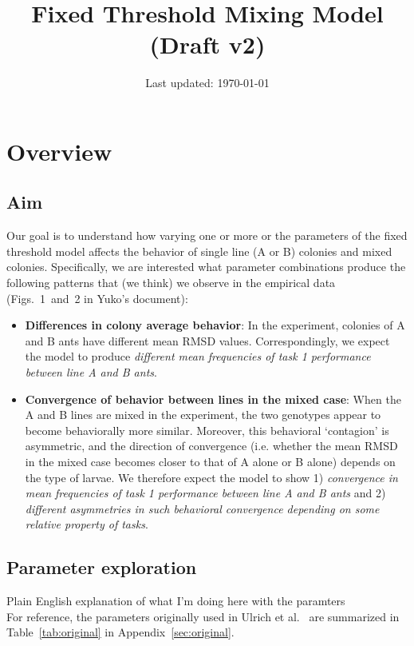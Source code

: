 \documentclass[11pt]{article}
\title{Fixed Threshold Mixing Model ({\color{red}Draft v2})}
\author{\hspace{0pt}\vspace{-30pt}}
\date{Last updated: \today}
\begin{document}
\maketitle
\tableofcontents

\newpage
\section{Overview}

\subsection{Aim}
Our goal is to understand how varying one or more or the parameters of the fixed threshold model affects the behavior of single line (A or B) colonies and mixed colonies. Specifically, we are interested what parameter combinations produce the following patterns that (we think) we observe in the empirical data (Figs.~1~and~2 in Yuko's document):

\begin{itemize}
    \item \textbf{Differences in colony average behavior}: 
    In the experiment, colonies of A and B ants have different mean RMSD values. Correspondingly, we expect the model to produce \textit{different mean frequencies of task 1 performance between line A and B ants}.

    \item \textbf{Convergence of behavior between lines in the mixed case}:
    When the A and B lines are mixed in the experiment, the two genotypes appear to become behaviorally more similar. Moreover, this behavioral `contagion' is asymmetric, and the direction of convergence (i.e. whether the mean RMSD in the mixed case becomes closer to that of A alone or B alone) depends on the type of larvae. We therefore expect the model to show 1) \textit{convergence in mean frequencies of task 1 performance between line A and B ants} and 2) \textit{different asymmetries in such behavioral convergence depending on some relative property of tasks}.
    
\end{itemize}
   
\subsection{Parameter exploration}
{\color{red}Plain English explanation of what I'm doing here with the paramters}
\\
For reference, the parameters originally used in Ulrich et al.~\cite{ulrich2018} are summarized in Table~\ref{tab:original} in Appendix~\ref{sec:original}.
\end{document}

